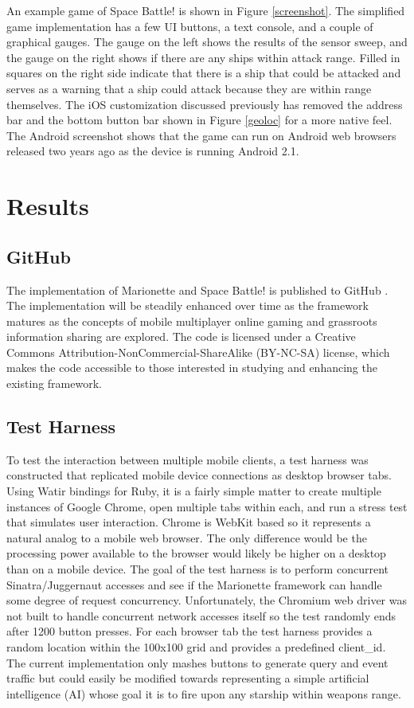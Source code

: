 \documentclass[12pt]{report}	%
\theoremstyle{definition}
\theoremstyle{remark}
\begin{document}
An example game of Space Battle! is shown in Figure
\ref{screenshot}. The simplified game implementation
has a few UI buttons, a text console, and a couple of graphical gauges.
The gauge on the left shows the results of the sensor sweep, and the
gauge on the right shows if there are any ships within attack range.
Filled in squares on the right side indicate that there is a ship that
could be attacked and serves as a warning that a ship could attack
because they are within range themselves. The iOS customization
discussed previously has removed the address bar and the bottom button
bar shown in Figure \ref{geoloc} for a more native
feel. The Android screenshot shows that the game can run on Android web
browsers released two years ago as the device is running Android 2.1.

\chapter{Results}

\section{GitHub}

The implementation of Marionette and Space Battle! is published to
GitHub \cite{marionette}. The implementation will be
steadily enhanced over time as the framework matures as the concepts of
mobile multiplayer online gaming and grassroots information sharing are
explored. The code is licensed under a Creative Commons
Attribution-NonCommercial-ShareAlike (BY-NC-SA) license, which makes the
code accessible to those interested in studying and enhancing the
existing framework.

\section{Test Harness}

To test the interaction between multiple mobile clients, a test harness
was constructed that replicated mobile device connections as desktop
browser tabs. Using Watir bindings for Ruby, it is a fairly simple
matter to create multiple instances of Google Chrome, open multiple tabs
within each, and run a stress test that simulates user interaction.
Chrome is WebKit based so it represents a natural analog to a mobile web
browser. The only difference would be the processing power available to
the browser would likely be higher on a desktop than on a mobile device.
The goal of the test harness is to perform concurrent Sinatra/Juggernaut
accesses and see if the Marionette framework can handle some degree of
request concurrency. Unfortunately, the Chromium web driver was not
built to handle concurrent network accesses itself so the test randomly
ends after 1200 button presses. For each browser tab
the test harness provides a random location within the 100x100 grid and
provides a predefined client\_id. The current implementation only mashes
buttons to generate query and event traffic but could easily be modified
towards representing a simple artificial intelligence (AI) whose goal it
is to fire upon any starship within weapons range.
\end{document}
